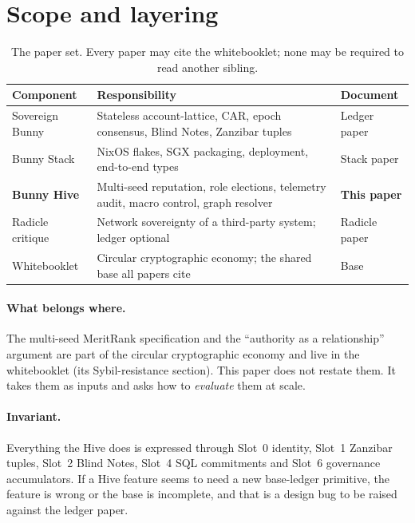 \documentclass[a4paper,11pt,twoside,parskip=half-,headings=small]{scrartcl}
\begin{document}
\tableofcontents
\newpage

\section{Scope and layering}
\label{sec:scope}

\begin{table}[H]
\centering\small
\begin{tabularx}{\textwidth}{@{}L{3.1cm}YL{3.2cm}@{}}
\toprule
\textbf{Component} & \textbf{Responsibility} & \textbf{Document} \\
\midrule
Sovereign Bunny & Stateless account-lattice, CAR, epoch consensus, Blind Notes, Zanzibar tuples & Ledger paper \\
Bunny Stack & NixOS flakes, SGX packaging, deployment, end-to-end types & Stack paper \\
\textbf{Bunny Hive} & Multi-seed reputation, role elections, telemetry audit, macro control, graph resolver & \textbf{This paper} \\
Radicle critique & Network sovereignty of a third-party system; ledger optional & Radicle paper \\
Whitebooklet & Circular cryptographic economy; the shared base all papers cite & Base \\
\bottomrule
\end{tabularx}
\caption{The paper set. Every paper may cite the whitebooklet; none may be required to read another sibling.}
\end{table}

\paragraph{What belongs where.} The multi-seed MeritRank specification and the ``authority as a relationship''
argument are part of the circular cryptographic economy and live in the whitebooklet (its Sybil-resistance section).
This paper does not restate them. It takes them as inputs and asks how to \emph{evaluate} them at scale.

\paragraph{Invariant.} Everything the Hive does is expressed through Slot~0 identity, Slot~1 Zanzibar tuples, Slot~2 Blind Notes,
Slot~4 SQL commitments and Slot~6 governance accumulators. If a Hive feature seems to need a new base-ledger primitive, the feature is
wrong or the base is incomplete, and that is a design bug to be raised against the ledger paper.
\end{document}

